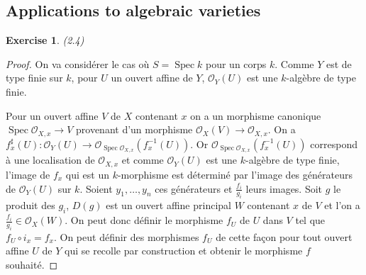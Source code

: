 \documentclass[A4, 11pt]{article}
\newtheorem{exer}{Exercise}
\def\Spec{ \operatorname{Spec}}
\begin{document}
 \subsection{Applications to algebraic varieties}
 \begin{exer} (2.4)
 \end{exer}
 \begin{proof}
 On va considérer le cas où $S=\Spec k$ pour un corps $k$. Comme $Y$ est de type finie sur $k$, pour $U$ un ouvert affine de $Y$, $\mathcal{O}_Y(U)$ est une $k$-algèbre de type finie. 
 
 Pour un ouvert affine $V$ de $X$ contenant $x$ on a un morphisme canonique $\Spec \mathcal{O}_{X,x} \rightarrow V$ provenant d'un morphisme $\mathcal{O}_X(V) \rightarrow \mathcal{O}_{X,x}$. 
 On a $f_x^{\sharp}(U)\colon \mathcal{O}_Y(U) \rightarrow \mathcal{O}_{\Spec \mathcal{O}_{X,x}}(f_x^{-1}(U))$. Or $\mathcal{O}_{\Spec \mathcal{O}_{X,x}}(f_x^{-1}(U))$ correspond à une localisation de $\mathcal{O}_{X,x}$ et comme $\mathcal{O}_Y(U)$ est une $k$-algèbre de type finie, l'image de $f_x$ qui est un $k$-morphisme est déterminé par l'image des générateurs de $\mathcal{O}_Y(U)$ sur $k$. Soient $y_1,\dots, y_n$ ces générateurs et $\frac{f_i}{g_i}$ leurs images. Soit $g$ le produit des $g_i$, $D(g)$ est un ouvert affine principal $W$ contenant $x$ de $V$ et l'on a $\frac{f_i}{g_i}\in \mathcal{O}_X(W)$. On peut donc définir le morphisme $f_U$ de $U$ dans $V$ tel que $f_U\circ i_x=f_x$. On peut définir des morphismes $f_U$ de cette façon pour tout ouvert affine $U$ de $Y$ qui se recolle par construction et obtenir le morphisme $f$ souhaité.
 \end{proof}
\end{document}
